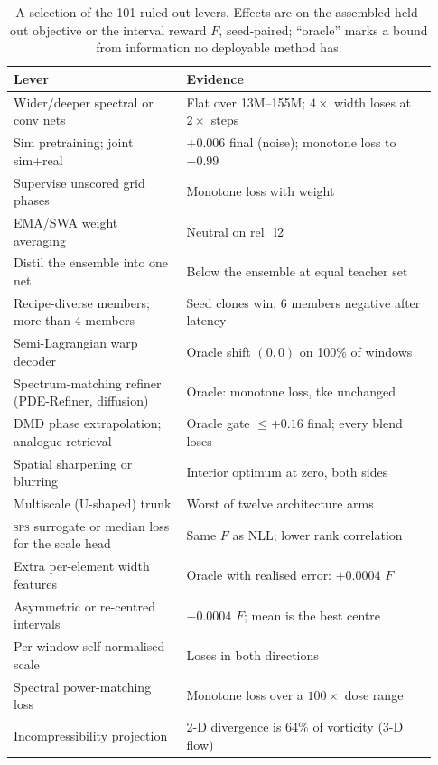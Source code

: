 \documentclass[10pt]{article}
\newcommand{\sps}{\textsc{sps}}
\begin{document}
\begin{table}[h]
\centering
\caption{A selection of the 101 ruled-out levers. Effects are on the assembled held-out objective or the interval reward $F$, seed-paired; ``oracle'' marks a bound from information no deployable method has.}
\small
\begin{tabular}{p{0.38\linewidth}p{0.55\linewidth}}
\toprule
Lever & Evidence\\
\midrule
Wider/deeper spectral or conv nets & Flat over 13M--155M; $4\times$ width loses at $2\times$ steps\\
Sim pretraining; joint sim+real & $+0.006$ final (noise); monotone loss to $-0.99$\\
Supervise unscored grid phases & Monotone loss with weight\\
EMA/SWA weight averaging & Neutral on rel\_l2\\
Distil the ensemble into one net & Below the ensemble at equal teacher set\\
Recipe-diverse members; more than 4 members & Seed clones win; 6 members negative after latency\\
Semi-Lagrangian warp decoder & Oracle shift $(0,0)$ on 100\% of windows\\
Spectrum-matching refiner (PDE-Refiner, diffusion) & Oracle: monotone loss, tke unchanged\\
DMD phase extrapolation; analogue retrieval & Oracle gate $\le+0.16$ final; every blend loses\\
Spatial sharpening or blurring & Interior optimum at zero, both sides\\
Multiscale (U-shaped) trunk & Worst of twelve architecture arms\\
\sps{} surrogate or median loss for the scale head & Same $F$ as NLL; lower rank correlation\\
Extra per-element width features & Oracle with realised error: $+0.0004$ $F$\\
Asymmetric or re-centred intervals & $-0.0004$ $F$; mean is the best centre\\
Per-window self-normalised scale & Loses in both directions\\
Spectral power-matching loss & Monotone loss over a $100\times$ dose range\\
Incompressibility projection & 2-D divergence is 64\% of vorticity (3-D flow)\\
\bottomrule
\end{tabular}
\end{table}
\end{document}

